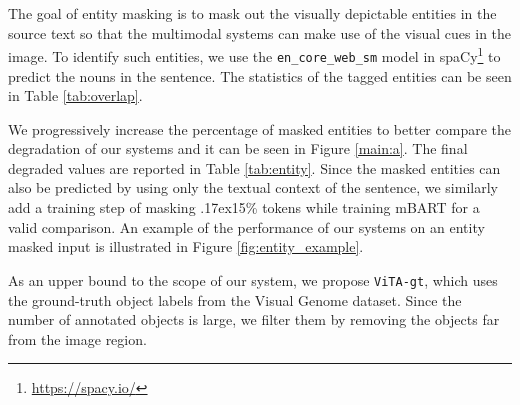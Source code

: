 \documentclass[11pt,a4paper]{article}
\newcommand{\approximately}{{\raise.17ex\hbox{}}}
\begin{document}
 
\begin{table}[t]
\centering
{}
\caption{The effect of entity masking on the BLEU score of the proposed models on the test set.}
\label{tab:entity}
\end{table}
 


The goal of entity masking is to mask out the visually depictable entities in the source text so that the multimodal systems can make use of the visual cues in the image. To identify such entities, we use the \texttt{en\_core\_web\_sm} model in spaCy\footnote{\label{spacyref}\url{https://spacy.io/}} to predict the nouns in the sentence. The statistics of the tagged entities can be seen in Table \ref{tab:overlap}.



We progressively increase the percentage of masked entities to better compare the degradation of our systems and it can be seen in Figure \ref{main:a}.
The final degraded values are reported in Table \ref{tab:entity}. Since the masked entities can also be predicted by using only the textual context of the sentence, we similarly add a training step of masking \approximately15\% tokens while training mBART for a valid comparison. An example of the performance of our systems on an entity masked input is illustrated in Figure \ref{fig:entity_example}.

As an upper bound to the scope of our system, we propose \texttt{ViTA-gt}, which uses the ground-truth object labels from the Visual Genome dataset. Since the number of annotated objects is large, we filter them by removing the objects far from the image region.

\begin{table}[t]
\centering
{}
\caption{The effect of color deprivation on the BLEU score of the proposed models on the test set.}
\label{tab:color}
\end{table}
 
\end{document}
